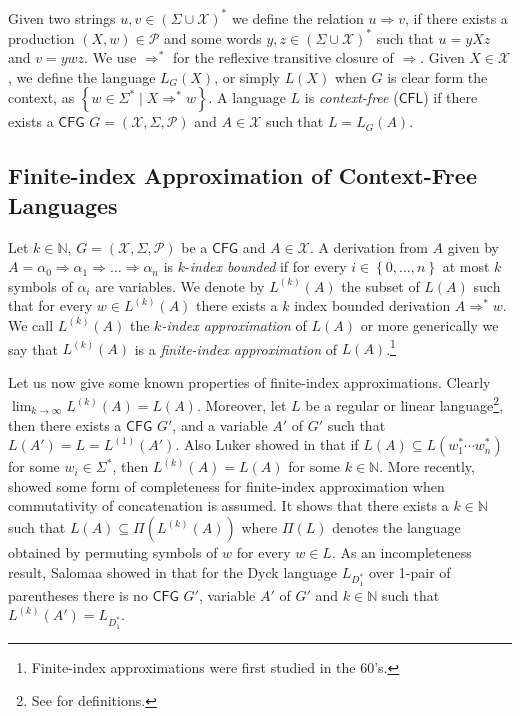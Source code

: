 \documentclass{fsttcs}
\def\set#1{{\left\{ #1 \right\}}}
\def\nats{{\mathbb{N}}}
\def\prod{\mathcal{P}}
\def\cfl{\mathsf{CFL}}
\def\cfg{\mathsf{CFG}}
\begin{document}
Given two strings $u,v \in (\Sigma \cup \mathcal{X})^*$ we define the relation
$u \Rightarrow v$, if there exists a production $(X, w)\in\prod$ and some words
$y,z \in (\Sigma \cup \mathcal{X})^*$ such that $u=yXz$ and $v=ywz$.  We use
$\Rightarrow^*$ for the reflexive transitive closure of $\Rightarrow$.  
Given $X\in \mathcal{X}$, we define the language $L_G(X)$, or simply \(L(X)\)
when \(G\) is clear form the context, as $\set{w\in\Sigma^*\mid X\Rightarrow^*
w}$. 
A language $L$ is \emph{context-free} (\(\cfl\)) if there exists a \(\cfg\) 
$G=(\mathcal{X},\Sigma,\prod)$ and \(A\in\mathcal{X}\) such that
$L=L_G(A)$.


\subsection{Finite-index Approximation of Context-Free Languages}

Let $k\in\nats$, $G=(\mathcal{X},\Sigma,\prod)$ be a \(\cfg\) and
$A\in\mathcal{X}$.  A derivation from \(A\) given by
$A=\alpha_0\Rightarrow\alpha_1\Rightarrow \dots \Rightarrow \alpha_n$ is 
\(k\)-\emph{index bounded} if for every $i\in\set{0,\dots,n}$ at most $k$ symbols of
$\alpha_i$ are variables.  We denote by $L^{(k)}(A)$ the subset of $L(A)$ such
that for every $w\in L^{(k)}(A)$ there exists a $k$ index bounded derivation
$A\Rightarrow^* w$.  We call \(L^{(k)}(A)\) the \emph{\(k\)-index
approximation} of \(L(A)\) or more generically we say that \(L^{(k)}(A)\) is a
\emph{finite-index approximation} of \(L(A)\).\footnote{Finite-index
approximations were first studied in the 60's.} 

Let us now give some known properties of finite-index approximations.
Clearly \(\lim_{k\rightarrow \infty} L^{(k)}(A)=L(A)\).  Moreover, let \(L\) be
a regular or linear language\footnote{See \cite{HMU06} for definitions.}, then
there exists a \(\cfg\) \(G'\), and a variable \(A'\) of \(G'\) such that
\(L(A')=L=L^{(1)}(A')\).  Also Luker showed in \cite{Luker78} that if \(L(A)\subseteq
L(w_1^* \cdots w_n^*) \) for some \(w_i\in\Sigma^*\), then \(L^{(k)}(A)=L(A)\)
for some \(k\in\nats\).  More recently, \cite{EKL08:icalp,gmm10} showed some
form of completeness for finite-index approximation when commutativity of
concatenation is assumed. It shows that there exists a \(k\in\nats\) such that
\(L(A)\subseteq \Pi(L^{(k)}(A))\) where \(\Pi(L)\) denotes the language
obtained by permuting symbols of \(w\) for every \(w\in L\).  As an
incompleteness result, Salomaa showed in \cite{Salomaa1969} that for the Dyck
language \(L_{D_1^*}\) over 1-pair of parentheses there is no \(\cfg\) \(G'\),
variable \(A'\) of \(G'\) and \(k\in\nats\) such that
\(L^{(k)}(A')=L_{D_1^*}\). 
\end{document}
